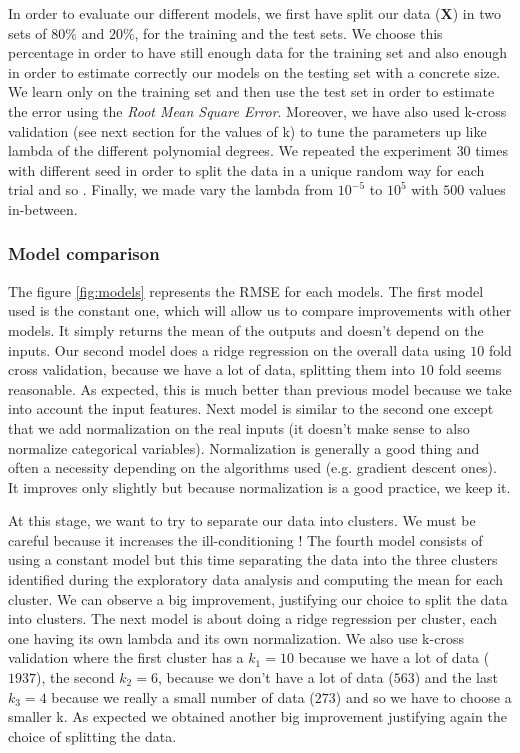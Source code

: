 \documentclass{article} %
\begin{document}
In order to evaluate our different models, we first have split our data ($\mathbf{X}$) in two sets of $80\%$ and $20\%$, for the training and the test sets. We choose this percentage in order to have still enough data for the training set and also enough in order to estimate correctly our models on the testing set with a concrete size. We learn only on the training set and then use the test set in order to estimate the error using the \textit{Root Mean Square Error}. Moreover, we have also used k-cross validation (see next section for the values of k) to tune the parameters up like lambda of the different polynomial degrees. We repeated the experiment $30$ times with different seed in order to split the data in a unique random way for each trial and so . Finally, we made vary the lambda from $10^{-5}$ to $10^{5}$ with $500$ values in-between.

\subsubsection{Model comparison}

The figure \ref{fig:models} represents the RMSE for each models. The first model used is the constant one, which will allow us to compare improvements with other models. It simply returns the mean of the outputs and doesn't depend on the inputs. Our second model does a ridge regression on the overall data using $10$ fold cross validation, because we have a lot of data, splitting them into $10$ fold seems reasonable. As expected, this is much better than previous model because we take into account the input features. Next model is similar to the second one except that we add normalization on the real inputs (it doesn't make sense to also normalize categorical variables). Normalization is generally a good thing and often a necessity depending on the algorithms used (e.g. gradient descent ones). It improves only slightly but because normalization is a good practice, we keep it.

At this stage, we want to try to separate our data into clusters. We must be careful because it increases the ill-conditioning ! The fourth model consists of using a constant model but this time separating the data into the three clusters identified during the exploratory data analysis and computing the mean for each cluster. We can observe a big improvement, justifying our choice to split the data into clusters. The next model is about doing a ridge regression per cluster, each one having its own lambda and its own normalization. We also use k-cross validation where the first cluster has a $k_1=10$ because we have a lot of data ($1937$), the second $k_2=6$, because we don't have a lot of data ($563$) and the last $k_3=4$ because we really a small number of data ($273$) and so we have to choose a smaller k. As expected we obtained another big improvement justifying again the choice of splitting the data.
\end{document}
